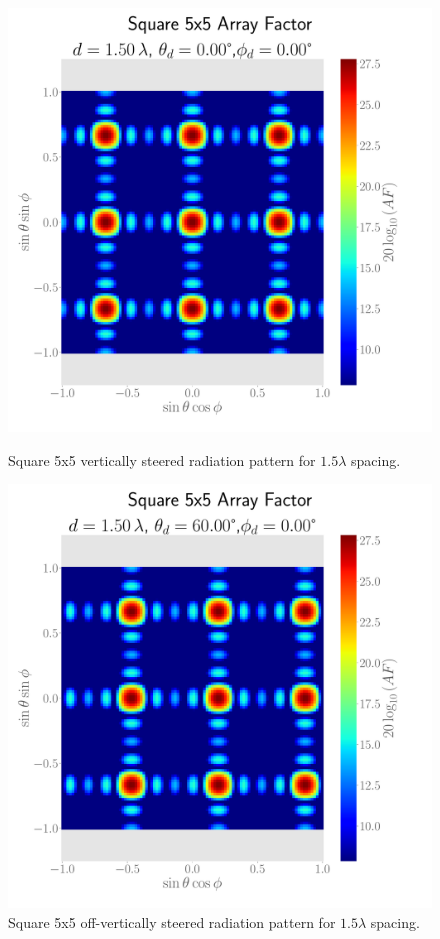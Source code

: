 \begin{figure}[H]
  \begin{minipage}[t]{0.45\textwidth}
    \centering
    \includegraphics[width=\textwidth]{graphics/task_1/square-1.50-lambda-0.00-theta-0.00-phi-radpat.pdf}
    \caption{Square 5x5 vertically steered radiation pattern for $1.5\lambda$ spacing.}\label{fig:rad-square-1.5-0}
  \end{minipage}\hfill
  \begin{minipage}[t]{0.45\textwidth}
    \centering
    \includegraphics[width=\textwidth]{graphics/task_1/square-1.50-lambda-60.00-theta-0.00-phi-radpat.pdf}
    \caption{Square 5x5 off-vertically steered radiation pattern for $1.5\lambda$ spacing.}\label{fig:rad-square-1.5-60}
   \end{minipage}
\end{figure}



